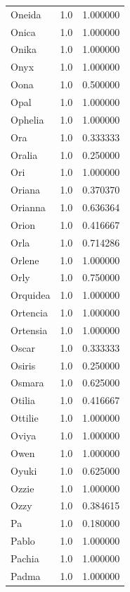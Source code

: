 \documentclass[
  letterpaper,
  DIV=11,
  numbers=noendperiod]{scrreprt}
\begin{document}
\begin{tabular}{lrr}
Oneida          &   1.0 &   1.000000 \\
Onica           &   1.0 &   1.000000 \\
Onika           &   1.0 &   1.000000 \\
Onyx            &   1.0 &   1.000000 \\
Oona            &   1.0 &   0.500000 \\
Opal            &   1.0 &   1.000000 \\
Ophelia         &   1.0 &   1.000000 \\
Ora             &   1.0 &   0.333333 \\
Oralia          &   1.0 &   0.250000 \\
Ori             &   1.0 &   1.000000 \\
Oriana          &   1.0 &   0.370370 \\
Orianna         &   1.0 &   0.636364 \\
Orion           &   1.0 &   0.416667 \\
Orla            &   1.0 &   0.714286 \\
Orlene          &   1.0 &   1.000000 \\
Orly            &   1.0 &   0.750000 \\
Orquidea        &   1.0 &   1.000000 \\
Ortencia        &   1.0 &   1.000000 \\
Ortensia        &   1.0 &   1.000000 \\
Oscar           &   1.0 &   0.333333 \\
Osiris          &   1.0 &   0.250000 \\
Osmara          &   1.0 &   0.625000 \\
Otilia          &   1.0 &   0.416667 \\
Ottilie         &   1.0 &   1.000000 \\
Oviya           &   1.0 &   1.000000 \\
Owen            &   1.0 &   1.000000 \\
Oyuki           &   1.0 &   0.625000 \\
Ozzie           &   1.0 &   1.000000 \\
Ozzy            &   1.0 &   0.384615 \\
Pa              &   1.0 &   0.180000 \\
Pablo           &   1.0 &   1.000000 \\
Pachia          &   1.0 &   1.000000 \\
Padma           &   1.0 &   1.000000 \\

\end{tabular}
\end{document}
